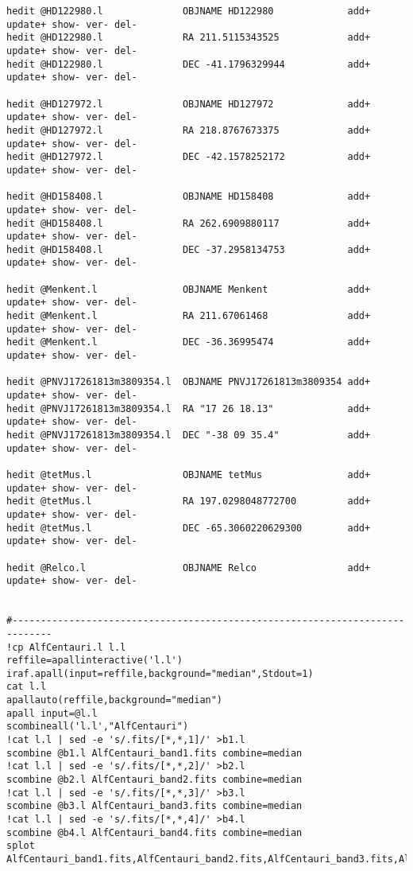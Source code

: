 \begin{verbatim}
hedit @HD122980.l              OBJNAME HD122980             add+ update+ show- ver- del-
hedit @HD122980.l              RA 211.5115343525            add+ update+ show- ver- del-
hedit @HD122980.l              DEC -41.1796329944           add+ update+ show- ver- del-

hedit @HD127972.l              OBJNAME HD127972             add+ update+ show- ver- del-
hedit @HD127972.l              RA 218.8767673375            add+ update+ show- ver- del-
hedit @HD127972.l              DEC -42.1578252172           add+ update+ show- ver- del-

hedit @HD158408.l              OBJNAME HD158408             add+ update+ show- ver- del-
hedit @HD158408.l              RA 262.6909880117            add+ update+ show- ver- del-
hedit @HD158408.l              DEC -37.2958134753           add+ update+ show- ver- del-

hedit @Menkent.l               OBJNAME Menkent              add+ update+ show- ver- del- 
hedit @Menkent.l               RA 211.67061468              add+ update+ show- ver- del-
hedit @Menkent.l               DEC -36.36995474             add+ update+ show- ver- del-

hedit @PNVJ17261813m3809354.l  OBJNAME PNVJ17261813m3809354 add+ update+ show- ver- del- 
hedit @PNVJ17261813m3809354.l  RA "17 26 18.13"             add+ update+ show- ver- del-
hedit @PNVJ17261813m3809354.l  DEC "-38 09 35.4"            add+ update+ show- ver- del-

hedit @tetMus.l                OBJNAME tetMus               add+ update+ show- ver- del-
hedit @tetMus.l                RA 197.0298048772700         add+ update+ show- ver- del-
hedit @tetMus.l                DEC -65.3060220629300        add+ update+ show- ver- del-

hedit @Relco.l                 OBJNAME Relco                add+ update+ show- ver- del- 


#-----------------------------------------------------------------------------
!cp AlfCentauri.l l.l
reffile=apallinteractive('l.l')
iraf.apall(input=reffile,background="median",Stdout=1)
cat l.l
apallauto(reffile,background="median")
apall input=@l.l
scombineall('l.l',"AlfCentauri")
!cat l.l | sed -e 's/.fits/[*,*,1]/' >b1.l
scombine @b1.l AlfCentauri_band1.fits combine=median
!cat l.l | sed -e 's/.fits/[*,*,2]/' >b2.l
scombine @b2.l AlfCentauri_band2.fits combine=median
!cat l.l | sed -e 's/.fits/[*,*,3]/' >b3.l
scombine @b3.l AlfCentauri_band3.fits combine=median
!cat l.l | sed -e 's/.fits/[*,*,4]/' >b4.l
scombine @b4.l AlfCentauri_band4.fits combine=median
splot AlfCentauri_band1.fits,AlfCentauri_band2.fits,AlfCentauri_band3.fits,AlfCentauri_band4.fits



\end{verbatim}
